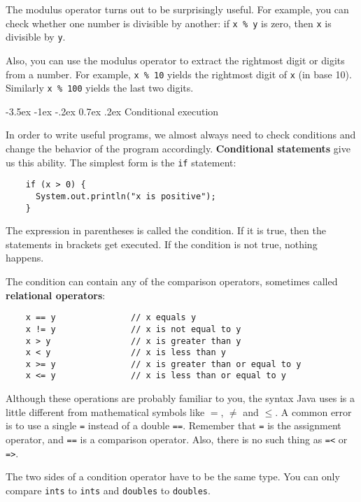 \documentclass{book}
\makeatletter
\renewcommand{\section}{\@startsection 
    {section} {1} {0mm}%
    {-3.5ex \@plus -1ex \@minus -.2ex}%
    {0.7ex \@plus.2ex}%
    {\normalfont\Large\bfseries}}
\makeatother
\begin{document}
The modulus operator turns out to be surprisingly useful.  For
example, you can check whether one number is divisible by
another: if {\tt x \% y} is zero, then {\tt x} is divisible
by {\tt y}.

Also, you can use the modulus operator to extract the rightmost
digit or digits from a number.  For example, {\tt x \% 10} yields
the rightmost digit of {\tt x} (in base 10).  Similarly
{\tt x \% 100} yields the last two digits.


\section{Conditional execution}

In order to write useful programs, we almost always need
to check conditions and change the behavior of the program
accordingly.  {\bf Conditional statements} give us this ability.  The
simplest form is the {\tt if} statement:

\begin{verbatim}
    if (x > 0) {
      System.out.println("x is positive");
    }
\end{verbatim}
%
The expression in parentheses is called the condition.
If it is true, then the statements in brackets get executed.
If the condition is not true, nothing happens.


The condition can contain any of the comparison operators,
sometimes called {\bf relational operators}:

\begin{verbatim}
    x == y               // x equals y
    x != y               // x is not equal to y
    x > y                // x is greater than y
    x < y                // x is less than y
    x >= y               // x is greater than or equal to y
    x <= y               // x is less than or equal to y
\end{verbatim}
%
Although these operations are probably familiar to you, the
syntax Java uses is a little different from mathematical
symbols like $=$, $\neq$ and $\le$.  A common error is
to use a single {\tt =} instead of a double {\tt ==}.  Remember
that {\tt =} is the assignment operator, and {\tt ==} is
a comparison operator.  Also, there is no such thing as
{\tt =<} or {\tt =>}.

The two sides of a condition operator have to be the same
type.  You can only compare {\tt ints} to {\tt ints} and
{\tt doubles} to {\tt doubles}.
\end{document}
